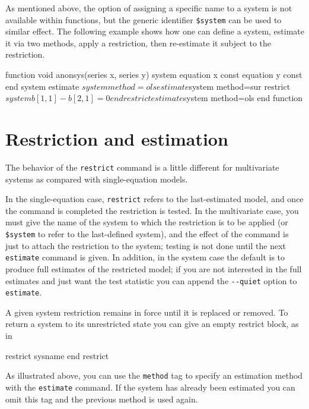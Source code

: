 As mentioned above, the option of assigning a specific name to a
system is not available within functions, but the generic identifier
\verb|$system| can be used to similar effect. The following example
shows how one can define a system, estimate it via two methods, apply
a restriction, then re-estimate it subject to the restriction.

\begin{code}
function void anonsys(series x, series y)
     system
         equation x const
         equation y const
     end system
     estimate $system method=ols
     estimate $system method=sur
     restrict $system
         b[1,1] - b[2,1] = 0
     end restrict
     estimate $system method=ols
end function
\end{code}

\section{Restriction and estimation}
\label{sec:sys-est}

The behavior of the \texttt{restrict} command is a little different
for multivariate systems as compared with single-equation models.

In the single-equation case, \texttt{restrict} refers to the
last-estimated model, and once the command is completed the
restriction is tested. In the multivariate case, you must give the
name of the system to which the restriction is to be applied (or
\verb|$system| to refer to the last-defined system), and the effect of
the command is just to attach the restriction to the system; testing
is not done until the next \texttt{estimate} command is given.  In
addition, in the system case the default is to produce full estimates
of the restricted model; if you are not interested in the full
estimates and just want the test statistic you can append the
\verb|--quiet| option to \texttt{estimate}.

A given system restriction remains in force until it is replaced or
removed. To return a system to its unrestricted state you can give
an empty restrict block, as in

\begin{code}
restrict sysname
end restrict
\end{code}

As illustrated above, you can use the \texttt{method} tag to specify
an estimation method with the \texttt{estimate} command. If the system
has already been estimated you can omit this tag and the previous
method is used again. 

